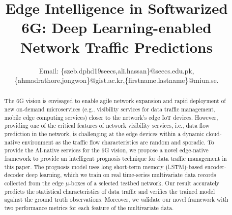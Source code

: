 \documentclass[10pt, conference]{IEEEtran}
\begin{document}
\title{Edge Intelligence in Softwarized 6G: Deep 
Learning-enabled Network Traffic Predictions}
\author{


Email: \{szeb.dphd19seecs,ali.hassan\}@seecs.edu.pk,
\{ahmadrathore,jongwon\}@gist.ac.kr,\{firstname.lastname\}@miun.se. 
\vspace{-10pt}
}

\maketitle

\begin{abstract}
The 6G vision is envisaged to enable agile network expansion and rapid deployment of new on-demand microservices (e.g., visibility services for data traffic management, mobile edge computing services) closer to the network's edge IoT devices.
However, providing one of the critical features of network visibility services, i.e., data flow prediction in the network, is challenging at the edge devices within a dynamic cloud-native environment as the traffic flow characteristics are random and sporadic.
To provide the AI-native services for the 6G vision, we propose a novel edge-native framework to provide an intelligent prognosis technique for data traffic management in this paper.
The prognosis model uses long short-term memory (LSTM)-based encoder-decoder deep learning, which we train on real time-series multivariate data records collected from the edge $\mu$-boxes of a selected testbed network.
Our result accurately predicts the statistical characteristics of data traffic and verifies the trained model against the ground truth observations. Moreover, we validate our novel framework with two performance metrics for each feature of the multivariate data.

\end{abstract}
\end{document}
